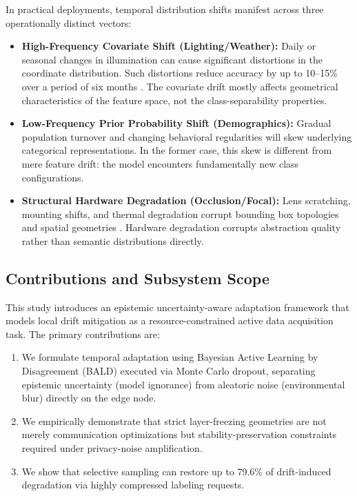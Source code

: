 \documentclass[conference]{IEEEtran}
\begin{document}
In practical deployments, temporal distribution shifts manifest across three operationally distinct vectors:
\begin{itemize}
    \item \textbf{High-Frequency Covariate Shift (Lighting/Weather):} Daily or seasonal changes in illumination can cause significant distortions in the coordinate distribution. Such distortions reduce accuracy by up to 10--15\% over a period of six months \cite{b7}. The covariate drift mostly affects geometrical characteristics of the feature space, not the class-separability properties.
    \item \textbf{Low-Frequency Prior Probability Shift (Demographics):} Gradual population turnover and changing behavioral regularities will skew underlying categorical representations. In the former case, this skew is different from mere feature drift: the model encounters fundamentally new class configurations.
    \item \textbf{Structural Hardware Degradation (Occlusion/Focal):} Lens scratching, mounting shifts, and thermal degradation corrupt bounding box topologies and spatial geometries \cite{b8}. Hardware degradation corrupts abstraction quality rather than semantic distributions directly.
\end{itemize}

\subsection{Contributions and Subsystem Scope}
This study introduces an epistemic uncertainty-aware adaptation framework that models local drift mitigation as a resource-constrained active data acquisition task. The primary contributions are:
\begin{enumerate}
    \item We formulate temporal adaptation using Bayesian Active Learning by Disagreement (BALD) executed via Monte Carlo dropout, separating epistemic uncertainty (model ignorance) from aleatoric noise (environmental blur) directly on the edge node.
    \item We empirically demonstrate that strict layer-freezing geometries are not merely communication optimizations but stability-preservation constraints required under privacy-noise amplification.
    \item We show that selective sampling can restore up to 79.6\% of drift-induced degradation via highly compressed labeling requests.
\end{enumerate}
\end{document}
